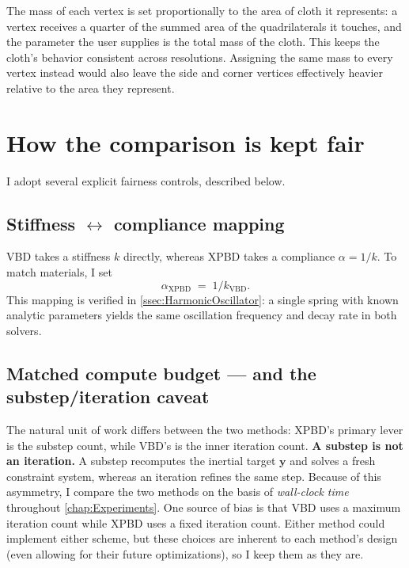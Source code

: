 The mass of each vertex is set proportionally to the area of cloth it represents:
a vertex receives a quarter of the summed area of the quadrilaterals it touches,
and the parameter the user supplies is the total mass of the cloth. This keeps the
cloth's behavior consistent across resolutions. Assigning the same mass to every
vertex instead would also leave the side and corner vertices effectively
heavier relative to the area they represent.

\section{How the comparison is kept fair}
\label{sec:Fairness}
I adopt several explicit fairness controls, described below.

\subsection{Stiffness $\leftrightarrow$ compliance mapping}
\label{ssec:StiffCompl}
VBD takes a stiffness $k$ directly, whereas XPBD takes a compliance
$\alpha = 1/k$. To match materials, I set
\begin{equation}
    \alpha_{\mathrm{XPBD}} \;=\; 1/k_{\mathrm{VBD}}.
\end{equation}
This mapping is verified in \autoref{ssec:HarmonicOscillator}: a single spring
with known analytic parameters yields the same oscillation frequency and decay
rate in both solvers.

\subsection{Matched compute budget --- and the substep/iteration caveat}
\label{ssec:ComputeBudget}
The natural unit of work differs between the two methods: XPBD's primary lever is
the substep count, while VBD's is the inner iteration count. \textbf{A substep is
not an iteration.} A substep recomputes the inertial target $\mathbf{y}$ and
solves a fresh constraint system, whereas an iteration refines the same step.
Because of this asymmetry, I compare the two methods on the basis of
\emph{wall-clock time} throughout \autoref{chap:Experiments}. One source of bias
is that VBD uses a maximum iteration count while XPBD uses a fixed iteration
count. Either method could implement either scheme, but these choices are
inherent to each method's design (even allowing for their future optimizations),
so I keep them as they are.

